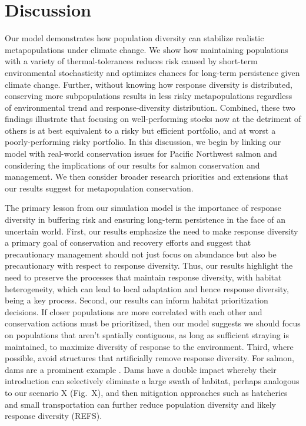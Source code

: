 \section{Discussion}

Our model demonstrates how population diversity can stabilize realistic metapopulations under climate change. We show how maintaining populations with a variety of thermal-tolerances reduces risk caused by short-term environmental stochasticity and optimizes chances for long-term persistence given climate change. Further, without knowing how response diversity is distributed, conserving more subpopulations results in less risky metapopulations regardless of environmental trend and response-diversity distribution. Combined, these two findings illustrate that focusing on well-performing stocks now at the detriment of others is at best equivalent to a risky but efficient portfolio, and at worst a poorly-performing risky portfolio. In this discussion, we begin by linking our model with real-world conservation issues for Pacific Northwest salmon and considering the implications of our results for salmon conservation and management. We then consider broader research priorities and extensions that our results suggest for metapopulation conservation.

The primary lesson from our simulation model is the importance of response diversity in buffering risk and ensuring long-term persistence in the face of an uncertain world. First, our results emphasize the need to make response diversity a primary goal of conservation and recovery efforts \citep{moore2010} and suggest that precautionary management should not just focus on abundance but also be precautionary with respect to response diversity. Thus, our results highlight the need to preserve the processes that maintain response diversity, with habitat heterogeneity, which can lead to local adaptation \citep{taylor1991, fraser2011} and hence response diversity, being a key process. Second, our results can inform habitat prioritization decisions. If closer populations are more correlated with each other and conservation actions must be prioritized, then our model suggests we should focus on populations that aren't spatially contiguous, as long as sufficient straying is maintained, to maximize diversity of response to the environment. Third, where possible, avoid structures that artificially remove response diversity. For salmon, dams are a prominent example \citep{waples2007, pess2012}. Dams have a double impact whereby their introduction can selectively eliminate a large swath of habitat, perhaps analogous to our scenario X (Fig.~X), and then mitigation approaches such as hatcheries and small transportation can further reduce population diversity and likely response diversity (REFS).

